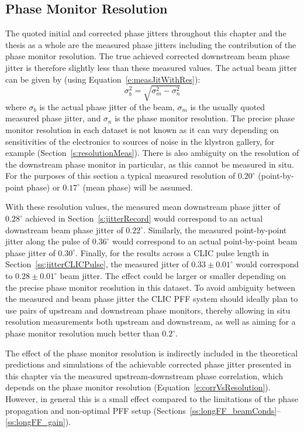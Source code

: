 \subsection{Phase Monitor Resolution}
\label{ss:longFF_phMonRes}

The quoted initial and corrected phase jitters throughout this chapter and the thesis as a whole are the measured phase jitters including the contribution of the phase monitor resolution. The true achieved corrected downstream beam phase jitter is therefore slightly less than these measured values. The actual beam jitter can be given by (using Equation~\ref{e:measJitWithRes}):
\begin{equation}
\sigma_b^2 = \sqrt{\sigma_m^2 - \sigma_n^2}
\end{equation}
where \(\sigma_b\) is the actual phase jitter of the beam, \(\sigma_m\) is the usually quoted measured phase jitter, and \(\sigma_n\) is the phase monitor resolution. The precise phase monitor resolution in each dataset is not known as it can vary depending on sensitivities of the electronics to sources of noise in the klystron gallery, for example (Section~\ref{s:resolutionMeas}). There is also ambiguity on the resolution of the downstream phase monitor in particular, as this cannot be measured in situ. For the purposes of this section a typical measured resolution of \(0.20^\circ\) (point-by-point phase) or \(0.17^\circ\) (mean phase) will be assumed.

With these resolution values, the measured mean downstream phase jitter of \(0.28^\circ\) achieved in Section~\ref{s:jitterRecord} would correspond to an actual downstream beam phase jitter of \(0.22^\circ\). Similarly, the measured point-by-point jitter along the pulse of \(0.36^\circ\) would correspond to an actual point-by-point beam phase jitter of \(0.30^\circ\). Finally, for the results across a CLIC pulse length in Section~\ref{ss:jitterCLICPulse}, the measured jitter of \(0.33\pm0.01^\circ\) would correspond to \(0.28\pm0.01^\circ\) beam jitter. The effect could be larger or smaller depending on the precise phase monitor reoslution in this dataset. To avoid ambiguity between the measured and beam phase jitter the CLIC PFF system should ideally plan to use pairs of upstream and downstream phase monitors, thereby allowing in situ resolution measurements both upstream and downstream, as well as aiming for a phase monitor resolution much better than \(0.2^\circ\).

The effect of the phase monitor resolution is indirectly included in the theoretical predictions and simulations of the achievable corrected phase jitter presented in this chapter via the measured upstream-downstream phase correlation, which depends on the phase monitor resolution (Equation~\ref{e:corrVsResolution}). However, in general this is a small effect compared to the limitations of the phase propagation and non-optimal PFF setup (Sections~\ref{ss:longFF_beamConds}--\ref{ss:longFF_gain}).



